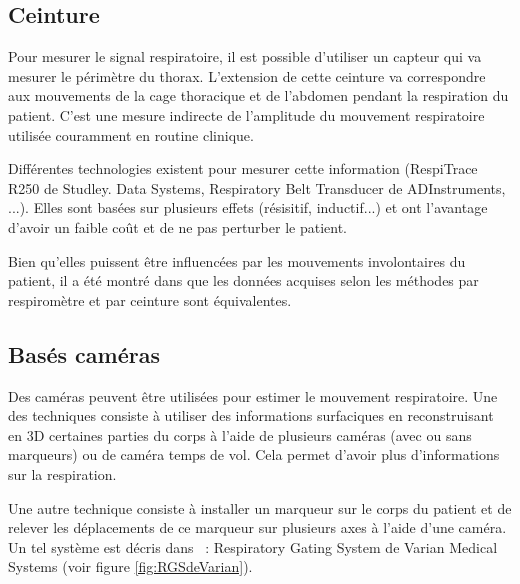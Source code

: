 \subsection{Ceinture}

Pour mesurer le signal respiratoire, il est possible d'utiliser un capteur qui va mesurer le périmètre du thorax. L'extension de cette ceinture va correspondre aux mouvements de la cage thoracique et de l'abdomen pendant la respiration du patient. C'est une mesure indirecte de l'amplitude du mouvement respiratoire utilisée couramment en routine clinique. 

Différentes technologies existent pour mesurer cette information (RespiTrace R250 de Studley. Data Systems, Respiratory Belt Transducer de ADInstruments, ...). Elles sont basées sur plusieurs effets (résisitif, inductif...) et ont l'avantage d'avoir un faible coût et de ne pas perturber le patient.

Bien qu'elles puissent être influencées par les mouvements involontaires du patient, il a été montré dans \cite{Guivarch2004Sync} que les données acquises selon les méthodes par respiromètre et par ceinture sont équivalentes.

\subsection{Basés caméras}

Des caméras peuvent être utilisées pour estimer le mouvement respiratoire. Une des techniques consiste à utiliser des informations surfaciques en reconstruisant en 3D certaines parties du corps à l'aide de plusieurs caméras (avec ou sans marqueurs) ou de caméra temps de vol. Cela permet d'avoir plus d'informations sur la respiration.

Une autre technique consiste à installer un marqueur sur le corps du patient et de relever les déplacements de ce marqueur sur plusieurs axes à l'aide d'une caméra. Un tel système est décris dans~\cite{nehmeh2002effect} : Respiratory Gating System de Varian Medical Systems (voir figure \ref{fig:RGSdeVarian}).

